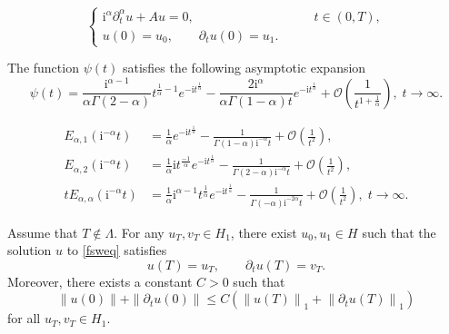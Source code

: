 \documentclass[10pt,a4paper]{amsart}
\begin{document}
\begin{equation}\label{fsweq}
\begin{cases}
\mathrm{i}^{\alpha}\partial_t^\alpha u +Au=0, &\qquad t \in (0,T),\\
u(0)=u_0, \qquad \partial_t u(0)=u_1.
\end{cases}
\end{equation}

\begin{lem}
The function $\psi(t)$ satisfies the following asymptotic expansion
\begin{equation}\label{asypsi}
\psi(t)=\frac{\mathrm{i}^{\alpha-1}}{\alpha\Gamma(2-\alpha)} t^{\frac{1}{\alpha}-1}e^{-\mathrm{i}t^{\frac{1}{\alpha}}}-\frac{2 \mathrm{i}^\alpha}{\alpha\Gamma(1-\alpha)t}e^{-\mathrm{i}t^{\frac{1}{\alpha}}}+\mathcal{O}\left(\frac{1}{t^{1+\frac{1}{\alpha}}}\right), \; t\to \infty.
\end{equation}
\end{lem}

\begin{equation}\label{asyE}
\begin{aligned}
E_{\alpha, 1}(\mathrm{i}^{-\alpha}t)&=\frac{1}{\alpha} e^{-\mathrm{i}t^{\frac{1}{\alpha}}}-\frac{1}{\Gamma(1-\alpha) \mathrm{i}^{-\alpha}t}+\mathcal{O}\left(\frac{1}{t^2}\right), \\
E_{\alpha, 2}(\mathrm{i}^{-\alpha}t)&=\frac{1}{\alpha} \mathrm{i}t^{\frac{-1}{\alpha}} e^{-\mathrm{i}t^{\frac{1}{\alpha}}}-\frac{1}{\Gamma(2-\alpha) \mathrm{i}^{-\alpha}t}+\mathcal{O}\left(\frac{1}{t^2}\right), \\
tE_{\alpha, \alpha}(\mathrm{i}^{-\alpha}t)&=\frac{1}{\alpha} \mathrm{i}^{\alpha-1}t^{\frac{1}{\alpha}} e^{-\mathrm{i}t^{\frac{1}{\alpha}}}-\frac{1}{\Gamma(-\alpha) \mathrm{i}^{-2\alpha}t} +\mathcal{O}\left(\frac{1}{t^2}\right), \; t\to \infty.
\end{aligned}
\end{equation}

\begin{theorem}
Assume that $T\notin \Lambda$. For any $u_T, v_T \in H_1$, there exist $u_0, u_1 \in H$ such that the solution $u$ to \eqref{fsweq} satisfies
$$
u(T)=u_T, \qquad \partial_t u(T)=v_T.
$$
Moreover, there exists a constant $C>0$ such that
\begin{equation}
\|u(0)\|+\|\partial_t u(0)\| \leq C\left(\left\|u(T)\right\|_{1}+\left\|\partial_t u(T)\right\|_{1}\right)
\end{equation}
for all $u_T, v_T \in H_1$.
\end{theorem}
\end{document}
